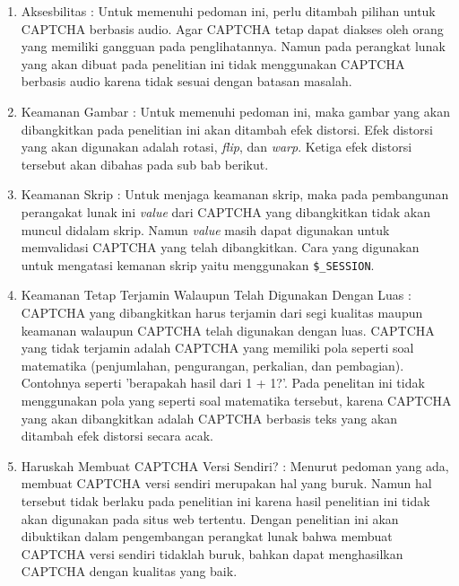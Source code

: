 \begin{enumerate}
\item
Aksesbilitas : Untuk memenuhi pedoman ini, perlu ditambah pilihan untuk CAPTCHA berbasis audio. Agar CAPTCHA tetap dapat diakses oleh orang yang memiliki gangguan pada penglihatannya. Namun pada perangkat lunak yang akan dibuat pada penelitian ini tidak menggunakan CAPTCHA berbasis audio karena tidak sesuai dengan batasan masalah.

\item
Keamanan Gambar : Untuk memenuhi pedoman ini, maka gambar yang akan dibangkitkan pada penelitian ini akan ditambah efek distorsi. Efek distorsi yang akan digunakan adalah rotasi, {\it flip}, dan {\it warp}. Ketiga efek distorsi tersebut akan dibahas pada sub bab berikut.

\item
Keamanan Skrip : Untuk menjaga keamanan skrip, maka pada pembangunan perangakat lunak ini {\it value} dari CAPTCHA yang dibangkitkan tidak akan muncul didalam skrip. Namun {\it value} masih dapat digunakan untuk memvalidasi CAPTCHA yang telah dibangkitkan. Cara yang digunakan untuk mengatasi kemanan skrip yaitu menggunakan \verb+$_SESSION+.

\item
Keamanan Tetap Terjamin Walaupun Telah Digunakan Dengan Luas : CAPTCHA yang dibangkitkan harus terjamin dari segi kualitas maupun keamanan walaupun CAPTCHA telah digunakan dengan luas. CAPTCHA yang tidak terjamin adalah CAPTCHA yang memiliki pola seperti soal matematika (penjumlahan, pengurangan, perkalian, dan pembagian). Contohnya seperti 'berapakah hasil dari 1 + 1?'. Pada penelitan ini tidak menggunakan pola yang seperti soal matematika tersebut, karena CAPTCHA yang akan dibangkitkan adalah CAPTCHA berbasis teks yang akan ditambah efek distorsi secara acak.

\item
Haruskah Membuat CAPTCHA Versi Sendiri? : Menurut pedoman yang ada, membuat CAPTCHA versi sendiri merupakan hal yang buruk. Namun hal tersebut tidak berlaku pada penelitian ini karena hasil penelitian ini tidak akan digunakan pada situs web tertentu. Dengan penelitian ini akan dibuktikan dalam pengembangan perangkat lunak bahwa membuat CAPTCHA versi sendiri tidaklah buruk, bahkan dapat menghasilkan CAPTCHA dengan kualitas yang baik.
\end{enumerate}

